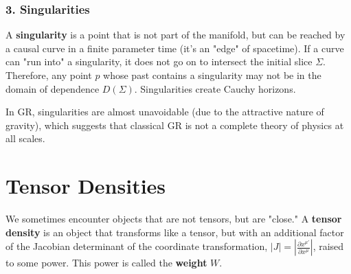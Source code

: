 \documentclass[11pt, a4paper]{report}
\begin{document}
\subsubsection*{3. Singularities}
A \textbf{singularity} is a point that is not part of the manifold, but can be reached by a causal curve in a finite parameter time (it's an "edge" of spacetime). If a curve can "run into" a singularity, it does not go on to intersect the initial slice $\Sigma$.
Therefore, any point $p$ whose past contains a singularity may not be in the domain of dependence $D(\Sigma)$. Singularities create Cauchy horizons.








In GR, singularities are almost unavoidable (due to the attractive nature of gravity), which suggests that classical GR is not a complete theory of physics at all scales.
\section{Tensor Densities}

We sometimes encounter objects that are not tensors, but are "close." A \textbf{tensor density} is an object that transforms like a tensor, but with an additional factor of the Jacobian determinant of the coordinate transformation, $\left| J \right| = \left|\frac{\partial x^{\mu'}}{\partial x^\mu}\right|$, raised to some power. This power is called the \textbf{weight} $W$.
\end{document}

